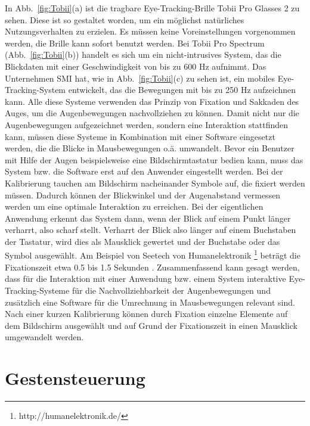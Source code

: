 In Abb.~\ref{fig:Tobii}(a) ist die tragbare Eye-Tracking-Brille Tobii Pro Glasses 2 zu sehen. Diese ist so gestaltet worden, um ein möglichst natürliches Nutzungsverhalten zu erzielen. Es müssen keine Voreinstellungen vorgenommen werden, die Brille kann sofort benutzt werden. Bei Tobii Pro Spectrum (Abb.~\ref{fig:Tobii}(b)) handelt es sich um ein nicht-intrusives System, das die Blickdaten mit einer Geschwindigkeit von bis zu 600 Hz aufnimmt. Das Unternehmen SMI hat, wie in Abb.~\ref{fig:Tobii}(c) zu sehen ist, ein mobiles Eye-Tracking-System entwickelt, das die Bewegungen mit bis zu 250 Hz aufzeichnen kann. Alle diese Systeme verwenden das Prinzip von Fixation und Sakkaden des Auges, um die Augenbewegungen nachvollziehen zu können. Damit nicht nur die Augenbewegungen aufgezeichnet werden, sondern eine Interaktion stattfinden kann, müssen diese Systeme in Kombination mit einer Software eingesetzt werden, die die Blicke in Mausbewegungen o.ä. umwandelt.
\newline \newline
Bevor ein Benutzer mit Hilfe der Augen beispielsweise eine Bildschirmtastatur bedien kann, muss das System bzw. die Software erst auf den Anwender eingestellt werden. Bei der Kalibrierung tauchen am Bildschirm nacheinander Symbole auf, die fixiert werden müssen. Dadurch können der Blickwinkel und der Augenabstand vermessen werden um eine optimale Interaktion zu erreichen. Bei der eigentlichen Anwendung erkennt das System dann, wenn der Blick auf einem Punkt länger verharrt, also scharf stellt. Verharrt der Blick also länger auf einem Buchstaben der Tastatur, wird dies als Mausklick gewertet und der Buchstabe oder das Symbol ausgewählt. Am Beispiel von Seetech von Humanelektronik%
\footnote{http://humanelektronik.de/}
%
beträgt die Fixationszeit etwa 0.5 bis 1.5 Sekunden \cite{SEETECH}.
\newline \newline \newline
Zusammenfassend kann gesagt werden, dass für die Interaktion mit einer Anwendung bzw. einem System interaktive Eye-Tracking-Systeme für die Nachvollziehbarkeit der Augenbewegungen und zusätzlich eine Software für die Umrechnung in Mausbewegungen relevant sind. Nach einer kurzen Kalibrierung können durch Fixation einzelne Elemente auf dem Bildschirm ausgewählt und auf Grund der Fixationszeit in einen Mausklick umgewandelt werden.

\section{Gestensteuerung}

